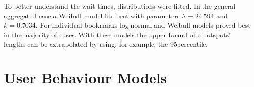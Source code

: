 To better understand the wait times, distributions were fitted. In the general aggregated case a Weibull model fits best with parameters $\lambda=24.594$ and $k=0.7034$. For individual bookmarks log-normal and Weibull models proved best in the majority of cases.
With these models the upper bound of a hotspots' lengths can be extrapolated by using, for example, the 95\sth percentile.


\section{User Behaviour Models}

